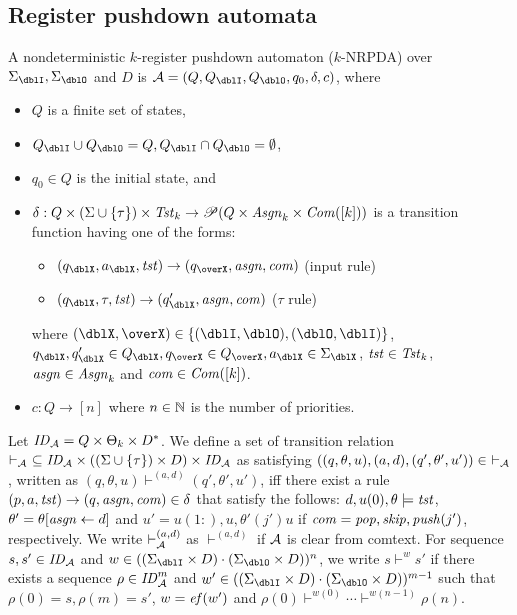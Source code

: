 \subsection{Register pushdown automata}\label{sec:RA}
\begin{definition}
A nondeterministic $k$-register pushdown automaton ($k$-NRPDA) over $\Sigma_\dblI,\Sigma_\dblO$ and $D$ is $\calA=(Q, Q_\dblI, Q_\dblO, q_0, \delta, c)$, where
\begin{itemize}
\item $Q$ is a finite set of states,
\item $Q_\dblI\cup Q_\dblO = Q, Q_\dblI\cap Q_\dblO = \emptyset$,
\item $q_0\in Q$ is the initial state, and
\item $\delta: Q \times (\Sigma\cup\{\tau\})\times \mathit{Tst}_k \to \mathscr{P}(Q \times\mathit{Asgn}_k\times \mathit{Com}([k]))$ is a transition function having one of the forms:
\begin{itemize}
\item $(q_\dblX,a_\dblX,\tst)\to(q_\overX,\asgn,\com)$ (input rule)
\item $(q_\dblX,\tau,\tst)\to(q'_\dblX,\asgn,\com)$ ($\tau$ rule)
\end{itemize}
where $(\dblX, \overX)\in\{(\dblI, \dblO), (\dblO,\dblI)\}$,
$q_\dblX, q'_\dblX\in Q_\dblX, q_\overX\in Q_\overX, a_\dblX\in \Sigma_\dblX$, $\mathit{tst}\in\mathit{Tst}_k$, $\mathit{asgn}\in\mathit{Asgn}_k$ and $\mathit{com}\in\mathit{Com}([k])$.
\item $c: Q \to [n]$ where $n\in \mathbb{N}$ is the number of priorities.
\end{itemize}
\end{definition}
\noindent
Let $\mathit{ID}_{\cal A}= Q\times \Theta_k\times D^*$.
We define a set of transition relation $\vdash_{\cal A}\ \subseteq\mathit{ID}_{\cal A}\times ((\Sigma\cup\{\tau\})\times D)\times \mathit{ID}_{\cal A}$ as satisfying
$((q,\theta,u), (a,d), (q',\theta',u'))\in\ \vdash_\calA$,
written as $(q,\theta,u)\vdash^{(a,d)}(q',\theta',u')$, iff
there exist a rule $(p, a, \mathit{tst}) \to (q, \mathit{asgn}, \mathit{com}) \in \delta$
that satisfy the follows:
$d, u(0), \theta\models\mathit{tst}$, $\theta' = \theta[\mathit{asgn}\leftarrow d]$ and
$u'= u(1:),u,\theta'(j')u$ if $\mathit{com}=\mathit{pop},\mathit{skip},\mathit{push}(j')$, respectively.
We write $\vdash^{(a,d)}_{\cal A}$ as $\vdash^{(a,d)}$ if ${\cal A}$ is clear from comtext.
For sequence $s,s'\in\mathit{ID}_{\cal A}$ and
$w\in((\Sigma_\dblI\times D)\cdot (\Sigma_\dblO\times D))^{n}$,
we write $s\vdash^{w}s'$ if
there exists a sequence $\rho\in\mathit{ID}_{\cal A}^{m}$ and
$w'\in((\Sigma_\dblI\times D)\cdot (\Sigma_\dblO\times D))^{m-1}$ such that
$\rho(0)=s, \rho(m)=s'$, $w=\mathit{ef}(w')$ and
$\rho(0)\vdash^{w(0)}\cdots\vdash^{w(n-1)}\rho(n)$.


